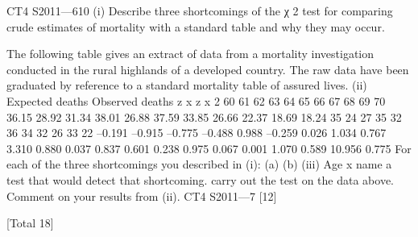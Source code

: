 \documentclass[a4paper,12pt]{article}
\begin{document}
\begin{enumerate}

CT4 S2011—610
(i)
Describe three shortcomings of the χ 2 test for comparing crude estimates
of mortality with a standard table and why they may occur.

The following table gives an extract of data from a mortality investigation conducted
in the rural highlands of a developed country. The raw data have been graduated by
reference to a standard mortality table of assured lives.
(ii)
Expected
deaths Observed
deaths z x z x 2
60
61
62
63
64
65
66
67
68
69
70 36.15
28.92
31.34
38.01
26.88
37.59
33.85
26.66
22.37
18.69
18.24 35
24
27
35
32
36
34
32
26
33
22 –0.191
–0.915
–0.775
–0.488
0.988
–0.259
0.026
1.034
0.767
3.310
0.880 0.037
0.837
0.601
0.238
0.975
0.067
0.001
1.070
0.589
10.956
0.775
For each of the three shortcomings you described in (i):
(a)
(b)
(iii)
Age
x
name a test that would detect that shortcoming.
carry out the test on the data above.
Comment on your results from (ii).
CT4 S2011—7
[12]

[Total 18]



\end{enumerate}
\end{document}
